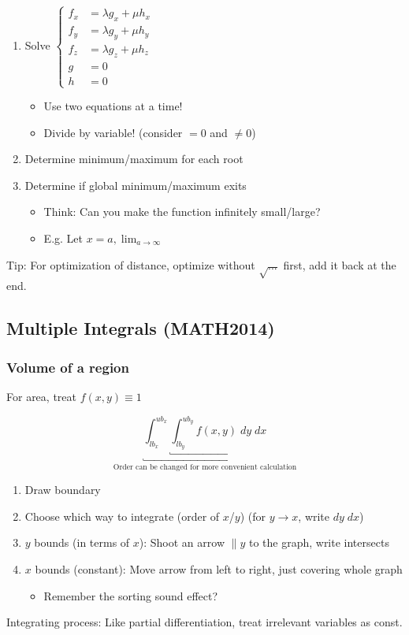 \begin{mdframed}[style=theorem]
	\begin{enumerate}
		\item Solve $\begin{cases}
		f_x &= \lambda g_x + \mu h_x \\ 
		f_y &= \lambda g_y + \mu h_y \\ 
		f_z &= \lambda g_z + \mu h_z \\ 
		g &= 0\\
		h &= 0
		\end{cases}$
		\begin{itemize}
			\item Use two equations at a time!
			\item Divide by variable! (consider $= 0$ and $\neq 0$)
		\end{itemize}
		\item Determine minimum/maximum for each root
		\item Determine if global minimum/maximum exits
		\begin{itemize}
			\item Think: Can you make the function infinitely small/large?
			\item E.g. Let $x=a, \displaystyle\lim_{a \to \infty}$
		\end{itemize}
	\end{enumerate}
	Tip: For optimization of distance, optimize without $\sqrt{...}$ first, add it back at the end.
\end{mdframed}

\subsection{Multiple Integrals (MATH2014)}

\subsubsection*{Volume of a region}
For area, treat $f(x, y) \equiv 1$

\begin{mdframed}[style=theorem]
	$$\underbracket{\int^{ub_x}_{lb_x} \underbracket{\int^{ub_y}_{lb_y} f(x, y) \; dy}_{} \; dx}_{\text{Order can be changed for more convenient calculation}}$$
	
	\begin{enumerate}
		\item Draw boundary
		\item Choose which way to integrate (order of $x$/$y$) (for $y \rightarrow x$, write $dy \; dx$)
		\item $y$ bounds (in terms of $x$): Shoot an arrow $\parallel y$ to the graph, write intersects
		\item $x$ bounds (constant): Move arrow from left to right, just covering whole graph
		\begin{itemize}
			\item Remember the sorting sound effect?
		\end{itemize}
	\end{enumerate}
	Integrating process: Like partial differentiation, treat irrelevant variables as const.
\end{mdframed}


